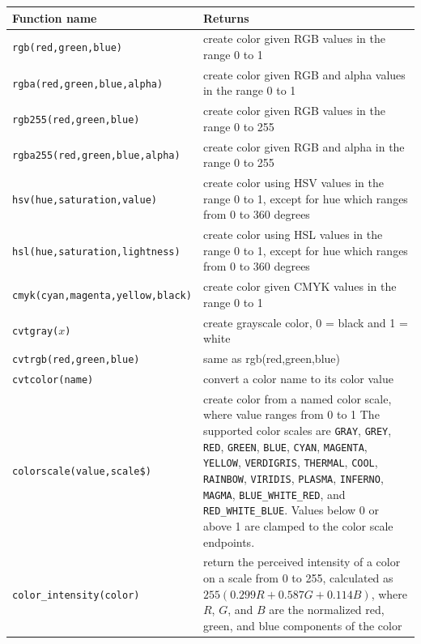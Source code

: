 \begin{supertabular}{l p{10cm}}
\hline Function name & Returns \\
\hline
{\tt rgb(red,green,blue)}  & create color given RGB values in the range 0 to 1 \\
{\tt rgba(red,green,blue,alpha)}  & create color given RGB and alpha values in the range 0 to 1 \\
{\tt rgb255(red,green,blue)}  & create color given RGB values in the range 0 to 255 \\
{\tt rgba255(red,green,blue,alpha)}  & create color given RGB and alpha in the range 0 to 255 \\
{\tt hsv(hue,saturation,value)}  & create color using HSV values in the range 0 to 1, except for hue which ranges from 0 to 360 degrees\\
{\tt hsl(hue,saturation,lightness)}  & create color using HSL values in the range 0 to 1, except for hue which ranges from 0 to 360 degrees \\
{\tt cmyk(cyan,magenta,yellow,black)}  & create color given CMYK values in the range 0 to 1 \\
{\tt cvtgray($x$)}  & create grayscale color, 0 = black and 1 = white \\
{\tt cvtrgb(red,green,blue)}  & same as rgb(red,green,blue) \\
{\tt cvtcolor(name)}  & convert a color name to its color value \\
{\tt colorscale(value,scale\$)}  & create color from a named color scale, where value ranges from 0 to 1 The supported color scales are {\tt GRAY}, {\tt GREY}, {\tt RED}, {\tt GREEN}, {\tt BLUE}, {\tt CYAN}, {\tt MAGENTA}, {\tt YELLOW}, {\tt VERDIGRIS}, {\tt THERMAL}, {\tt COOL}, {\tt RAINBOW}, {\tt VIRIDIS}, {\tt PLASMA}, {\tt INFERNO}, {\tt MAGMA}, {\tt BLUE\_WHITE\_RED}, and {\tt RED\_WHITE\_BLUE}. Values below 0 or above 1 are clamped to the color scale endpoints. \\
{\tt color\_intensity(color)}  & return the perceived intensity of a color on a scale from 0 to 255, calculated as $255(0.299R + 0.587G + 0.114B)$, where $R$, $G$, and $B$ are the normalized red, green, and blue components of the color \\
\end{supertabular}\\
\vspace{2ex}


